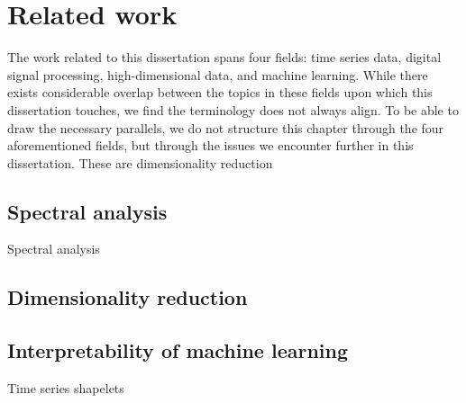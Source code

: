 \chapter{Related work}

The work related to this dissertation spans four fields: time series data, digital signal processing, high-dimensional data, and machine learning.
While there exists considerable overlap between the topics in these fields upon which this dissertation touches, we find the terminology does not always align.
To be able to draw the necessary parallels, we do not structure this chapter through the four aforementioned fields, but through the issues we encounter further in this dissertation.
These are dimensionality reduction

\section{Spectral analysis}

Spectral analysis

\section{Dimensionality reduction}


\section{Interpretability of machine learning}

Time series shapelets  \citep{DBLP:conf/kdd/YeK09}
